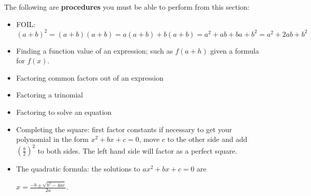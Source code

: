 \documentclass{ximera}
\begin{document}
The following are \textbf{procedures} you must be able to perform from this section:
\begin{itemize}
\item FOIL: $(a+b)^2 = (a+b)(a+b)=a(a+b)+b(a+b)=a^2+ab+ba+b^2=a^2+2ab+b^2$
\item Finding a function value of an expression; such as $f(a+h)$ given a formula for $f(x)$.
\item Factoring common factors out of an expression
\item Factoring a trinomial
\item Factoring to solve an equation
\item Completing the square: first factor constants if necessary to get your polynomial in the form $x^2+bx+c=0$, move $c$ to the other side and add $\displaystyle \left(\frac{b}{2}\right)^2$ to both sides. The left hand side will factor as a perfect square.
\item The quadratic formula: the solutions to $ax^2+bx+c=0$ are 

$x=\displaystyle \frac{-b\pm \sqrt{b^2-4ac}}{2a}$.
\end{itemize}
\end{document}
